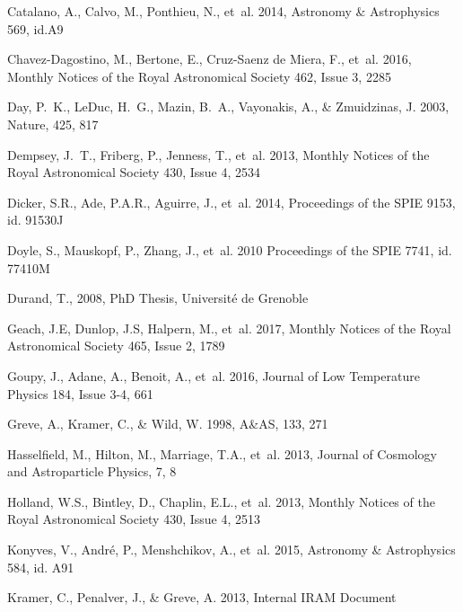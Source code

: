 \begin{thebibliography}{99}
Catalano, A., Calvo, M., Ponthieu, N., {et~al.} 2014, 
Astronomy \& Astrophysics 569, id.A9

Chavez-Dagostino, M., Bertone, E., Cruz-Saenz de Miera, F., {et~al.} 2016, 
Monthly Notices of the Royal Astronomical Society 462, Issue 3, 2285

Day, P.~K., LeDuc, H.~G., Mazin, B.~A., Vayonakis, A., \& Zmuidzinas, J. 2003,
Nature, 425, 817

Dempsey, J.~T., Friberg, P., Jenness, T., {et~al.} 2013,
Monthly Notices of the Royal Astronomical Society 430, Issue 4, 2534

Dicker, S.R., Ade, P.A.R., Aguirre, J., {et~al.} 2014,
Proceedings of the SPIE 9153, id. 91530J 

Doyle, S., Mauskopf, P., Zhang, J., {et~al.} 2010
Proceedings of the SPIE 7741, id. 77410M

Durand, T., 2008, 
PhD Thesis, Universit\' e de Grenoble

Geach, J.E, Dunlop, J.S, Halpern, M., {et~al.} 2017, 
Monthly Notices of the Royal Astronomical Society 465, Issue 2, 1789

Goupy, J., Adane, A., Benoit, A., {et~al.} 2016, 
Journal of Low Temperature Physics 184, Issue 3-4, 661

Greve, A., Kramer, C., \& Wild, W. 1998, 
A\&AS, 133, 271

Hasselfield, M., Hilton, M., Marriage, T.A., {et~al.} 2013, 
Journal of Cosmology and Astroparticle Physics, 7, 8

Holland, W.S., Bintley, D., Chaplin, E.L., {et~al.} 2013, 
Monthly Notices of the Royal Astronomical Society 430, Issue 4, 2513

Konyves, V., Andr\'e, P., Menshchikov, A., {et~al.} 2015, 
Astronomy \& Astrophysics 584, id. A91

Kramer, C., Penalver, J., \& Greve, A. 2013, Internal IRAM Document


\end{thebibliography}
